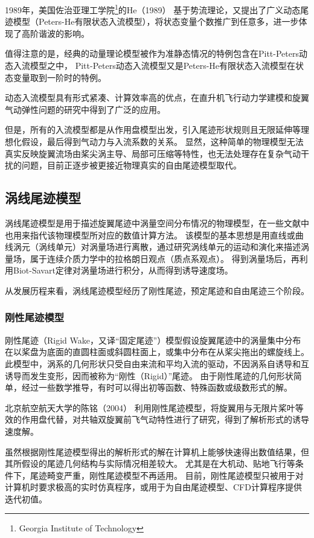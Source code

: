 1989年，美国佐治亚理工学院\footnote{Georgia Institute of Technology}的He（1989）
基于势流理论，又提出了广义动态尾迹模型（Peters-He有限状态入流模型），将状态变量个数推广到任意多，进一步体现了高阶谐波的影响。

值得注意的是，经典的动量理论模型被作为准静态情况的特例包含在Pitt-Peters动态入流模型之中，
Pitt-Peters动态入流模型又是Peters-He有限状态入流模型在状态变量取到一阶时的特例。

动态入流模型具有形式紧凑、计算效率高的优点，在直升机飞行动力学建模和旋翼气动弹性问题的研究中得到了广泛的应用。

但是，所有的入流模型都是从作用盘模型出发，引入尾迹形状规则且无限延伸等理想化假设，最后得到气动力与入流系数的关系。
显然，这种简单的物理模型无法真实反映旋翼流场由桨尖涡主导、局部可压缩等特性，也无法处理存在复杂气动干扰的问题，目前正逐步被更接近物理真实的自由尾迹模型取代。

\subsection{涡线尾迹模型}
涡线尾迹模型是用于描述旋翼尾迹中涡量空间分布情况的物理模型，在一些文献中也用来指代该物理模型所对应的数值计算方法。
该模型的基本思想是用直线或曲线涡元（涡线单元）对涡量场进行离散，通过研究涡线单元的运动和演化来描述涡量场，属于连续介质力学中的拉格朗日观点（质点系观点）。
得到涡量场后，再利用Biot-Savart定律对涡量场进行积分，从而得到诱导速度场。

从发展历程来看，涡线尾迹模型经历了刚性尾迹，预定尾迹和自由尾迹三个阶段。

\subsubsection{刚性尾迹模型}
刚性尾迹（Rigid Wake，又译“固定尾迹”）模型假设旋翼尾迹中的涡量集中分布在以桨盘为底面的直圆柱面或斜圆柱面上，或集中分布在从桨尖拖出的螺旋线上。
此模型中，涡系的几何形状只受自由来流和平均入流的驱动，不因涡系自诱导和互诱导而发生变形，因而被称为“刚性（Rigid）”尾迹。
由于刚性尾迹的几何形状简单，经过一些数学推导，有时可以得出初等函数、特殊函数或级数形式的解。

北京航空航天大学的陈铭（2004）
利用刚性尾迹模型，将旋翼用与无限片桨叶等效的作用盘代替，对共轴双旋翼前飞气动特性进行了研究，得到了解析形式的诱导速度解。

虽然根据刚性尾迹模型得出的解析形式的解在计算机上能够快速得出数值结果，但其所假设的尾迹几何结构与实际情况相差较大。
尤其是在大机动、贴地飞行等条件下，尾迹畸变严重，刚性尾迹模型不再适用。
目前，刚性尾迹模型只被用于对计算机时要求极高的实时仿真程序，或用于为自由尾迹模型、CFD计算程序提供迭代初值。

